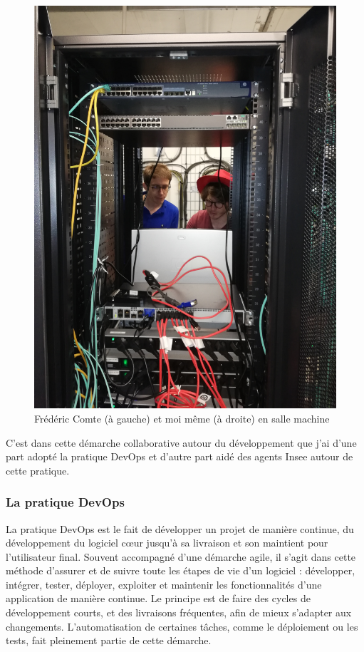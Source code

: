 \begin{figure}[H]
    \centering
    \includegraphics[scale=0.10]{images/salle-machine.jpg}
    \caption{Frédéric Comte (à gauche) et moi même (à droite) en salle machine}
    \label{fig:salle-machine}
\end{figure}
\vspace{10pt}

C'est dans cette démarche collaborative autour du développement que j'ai d'une part adopté la pratique DevOps et d'autre part aidé des agents Insee autour de cette pratique.
\label{section 2.2.2 - Séminaire du développement}

\subsubsection{La pratique DevOps}
La pratique DevOps est le fait de développer un projet de manière continue, du développement du logiciel cœur jusqu'à sa livraison et son maintient pour l'utilisateur final. Souvent accompagné d'une démarche agile, il s'agit dans cette méthode d'assurer et de suivre toute les étapes de vie d'un logiciel : développer, intégrer, tester, déployer, exploiter et maintenir les fonctionnalités d'une application de manière continue. Le principe est de faire des cycles de développement courts, et des livraisons fréquentes, afin de mieux s'adapter aux changements. L'automatisation de certaines tâches, comme le déploiement ou les tests, fait pleinement partie de cette démarche.
\newline

